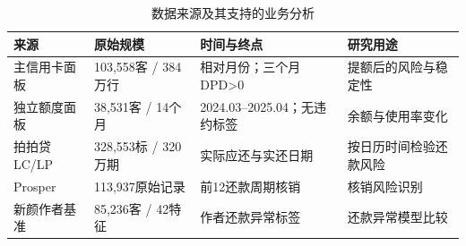 \begin{table}[H]\centering\caption{数据来源及其支持的业务分析}
\fontsize{9.1bp}{12.5bp}\selectfont
\begin{tabularx}{\linewidth}{@{}p{24mm}p{36mm}YY@{}}
\toprule
来源 & 原始规模 & 时间与终点 & 研究用途 \\
\midrule
主信用卡面板 & 103,558客 / 384万行 & 相对月份；三个月DPD>0 & 提额后的风险与稳定性 \\
独立额度面板 & 38,531客 / 14个月 & 2024.03–2025.04；无违约标签 & 余额与使用率变化 \\
拍拍贷LC/LP & 328,553标 / 320万期 & 实际应还与实还日期 & 按日历时间检验还款风险 \\
Prosper & 113,937原始记录 & 前12还款周期核销 & 核销风险识别 \\
新颜作者基准 & 85,236客 / 42特征 & 作者还款异常标签 & 还款异常模型比较 \\
\bottomrule\end{tabularx}
\end{table}
